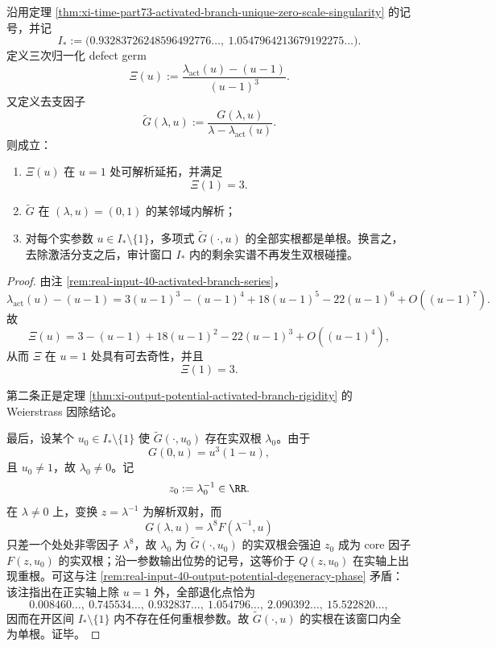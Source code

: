 \begin{theorem}[激活分支的三次归一化刚性与去支实谱的无碰撞窗口]\label{thm:xi-time-part73-activated-branch-deflation-window}
沿用定理 \ref{thm:xi-time-part73-activated-branch-unique-zero-scale-singularity} 的记号，并记
\[
I_\ast:=
\bigl(0.93283726248596492776\ldots,\ 1.0547964213679192275\ldots\bigr).
\]
定义三次归一化 defect germ
\[
\Xi(u):=\frac{\lambda_{\mathrm{act}}(u)-(u-1)}{(u-1)^3}.
\]
又定义去支因子
\[
\widetilde G(\lambda,u):=\frac{G(\lambda,u)}{\lambda-\lambda_{\mathrm{act}}(u)}.
\]
则成立：
\begin{enumerate}
  \item \(\Xi(u)\) 在 \(u=1\) 处可解析延拓，并满足
  \[
  \Xi(1)=3.
  \]
  \item \(\widetilde G\) 在 \((\lambda,u)=(0,1)\) 的某邻域内解析；
  \item 对每个实参数 \(u\in I_\ast\setminus\{1\}\)，多项式 \(\widetilde G(\cdot,u)\) 的全部实根都是单根。换言之，去除激活分支之后，审计窗口 \(I_\ast\) 内的剩余实谱不再发生双根碰撞。
\end{enumerate}
\end{theorem}
\begin{proof}
由注 \ref{rem:real-input-40-activated-branch-series}，
\[
\lambda_{\mathrm{act}}(u)-(u-1)
=
3(u-1)^3-(u-1)^4+18(u-1)^5-22(u-1)^6+O((u-1)^7).
\]
故
\[
\Xi(u)
=
3-(u-1)+18(u-1)^2-22(u-1)^3+O((u-1)^4),
\]
从而 \(\Xi\) 在 \(u=1\) 处具有可去奇性，并且
\[
\Xi(1)=3.
\]

第二条正是定理 \ref{thm:xi-output-potential-activated-branch-rigidity} 的 Weierstrass 因除结论。

最后，设某个 \(u_0\in I_\ast\setminus\{1\}\) 使 \(\widetilde G(\cdot,u_0)\) 存在实双根 \(\lambda_0\)。由于
\[
G(0,u)=u^3(1-u),
\]
且 \(u_0\neq 1\)，故 \(\lambda_0\neq 0\)。记
\[
z_0:=\lambda_0^{-1}\in \RR.
\]
在 \(\lambda\neq 0\) 上，变换 \(z=\lambda^{-1}\) 为解析双射，而
\[
G(\lambda,u)=\lambda^8F(\lambda^{-1},u)
\]
只差一个处处非零因子 \(\lambda^8\)，故 \(\lambda_0\) 为 \(\widetilde G(\cdot,u_0)\) 的实双根会强迫 \(z_0\) 成为 core 因子 \(F(z,u_0)\) 的实双根；沿一参数输出位势的记号，这等价于 \(Q(z,u_0)\) 在实轴上出现重根。可这与注 \ref{rem:real-input-40-output-potential-degeneracy-phase} 矛盾：该注指出在正实轴上除 \(u=1\) 外，全部退化点恰为
\[
0.008460\ldots,\ 0.745534\ldots,\ 0.932837\ldots,\ 1.054796\ldots,\ 2.090392\ldots,\ 15.522820\ldots,
\]
因而在开区间 \(I_\ast\setminus\{1\}\) 内不存在任何重根参数。故 \(\widetilde G(\cdot,u)\) 的实根在该窗口内全为单根。证毕。
\end{proof}


